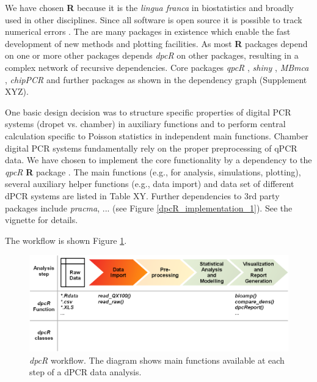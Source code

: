 \documentclass[a4,center,fleqn]{NAR}
\begin{document}
We have chosen \textbf{R} because it is the \textit{lingua franca} in 
biostatistics and broadly used in other disciplines. Since all software is open 
source it is possible to track numerical errors \cite{rodiger_r_2015}. The are 
many packages in existence which enable the fast development of new methods and 
plotting facilities. As most \textbf{R} packages depend on one or more other 
packages \cite{ooms_2013} depends \textit{dpcR} on other packages, resulting in 
a complex network of recursive dependencies. Core packages \textit{qpcR} 
\cite{ritz_qpcr_2008}, \textit{shiny} \cite{shiny}, \textit{MBmca} 
\cite{rodiger_surface_2013}, \textit{chipPCR} \cite{rodiger_chippcr_2015} and 
further packages as shown in the dependency graph (Supplement XYZ).

One basic design decision was to structure specific properties of digital PCR 
systems (dropet vs. chamber) in auxiliary functions and to perform central 
calculation specific to Poisson statistics in independent main functions. 
Chamber digital PCR systems fundamentally rely on the proper preprocessing of 
qPCR data. We have chosen to implement the core functionality by a dependency to 
the \textit{qpcR} \textbf{R} package \cite{ritz_qpcr_2008}. The main functions 
(e.g., for analysis, simulations, plotting), several auxiliary helper functions 
(e.g., data import) and data set of different dPCR systems are listed in Table 
XY. Further dependencies to 3rd party packages include \textit{pracma}, ... (see 
Figure \ref{dpcR_implementation_1}). See the vignette for details.

The workflow is shown Figure \ref{workflow}.

\begin{figure}[t]
\begin{center}
\includegraphics[width=17cm]{workflow.png}
\end{center}
\caption{\textit{dpcR} workflow. The diagram shows main functions available at 
each step of a dPCR data analysis.}
\label{workflow}
\end{figure}
\end{document}
